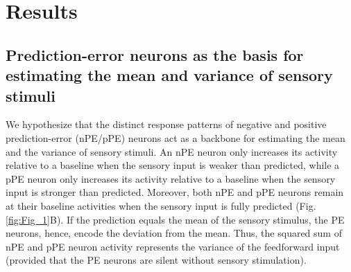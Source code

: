 \documentclass[10pt,a4paper,draft]{article}
\begin{document}
\section*{Results}
%

\subsection*{Prediction-error neurons as the basis for estimating the mean and variance of sensory stimuli}
%
We hypothesize that the distinct response patterns of negative and positive prediction-error (nPE/pPE) neurons act as a backbone for estimating the mean and the variance of sensory stimuli. An nPE neuron only increases its activity relative to a baseline when the sensory input is weaker than predicted, while a pPE neuron only increases its activity relative to a baseline when the sensory input is stronger than predicted. Moreover, both nPE and pPE neurons remain at their baseline activities when the sensory input is fully predicted (Fig. \ref{fig:Fig_1}B). If the prediction equals the mean of the sensory stimulus, the PE neurons, hence, encode the deviation from the mean. Thus, the squared sum of nPE and pPE neuron activity represents the variance of the feedforward input (provided that the PE neurons are silent without sensory stimulation).
%
\end{document}
